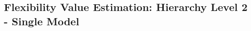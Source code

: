 \begin{table}[]
\centering
\caption{Results of model evaluation procedure for the climatology model in the first level of the hierarchy, using the Brier Score (BS) as a performance score.}
\label{tab:level1-scores}
\end{table}

\subsection{Flexibility Value Estimation: Hierarchy Level 2 - Single Model}\label{Sect:ResultsLevel2SingleModel} 

